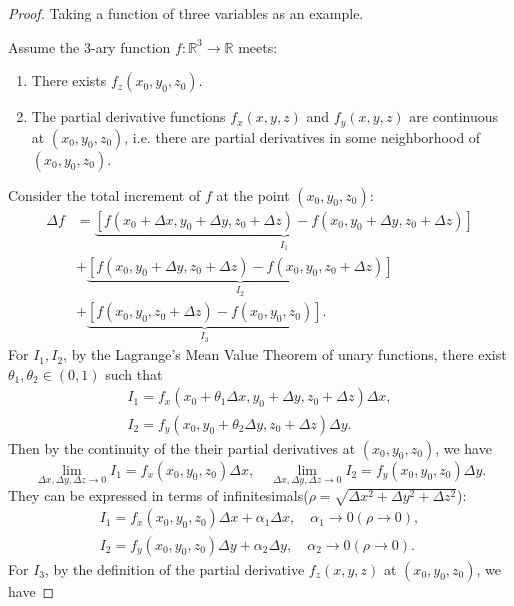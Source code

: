 \documentclass[11pt]{../../TexTemplate/elegantbook}
\begin{document}
\begin{proof}
    Taking a function of three variables as an example.

    Assume the \(3\)-ary function \(f: \mathbb{R}^3 \to \mathbb{R}\) meets:
    \begin{enumerate}
        \item There exists \(f_{z}(x_{0},y_{0},z_{0})\). 
        \item The partial derivative functions \(f_{x}(x,y,z)\) and \(f_{y}(x,y,z)\) are continuous at \((x_{0},y_{0},z_{0})\),
            i.e. there are partial derivatives in some neighborhood of \((x_{0},y_{0},z_{0})\).
    \end{enumerate}
    Consider the total increment of \(f\) at the point \((x_{0},y_{0},z_{0})\):
    \begin{align*}
        \Delta f 
        &= \underbrace{\left[ f(x_0 + \Delta x, y_0 + \Delta y, z_0 + \Delta z) - f(x_0, y_0 + \Delta y, z_0 + \Delta z) \right]}_{I_1}\\
        &+ \underbrace{\left[ f(x_0, y_0 + \Delta y, z_0 + \Delta z) - f(x_0, y_0, z_0 + \Delta z) \right]}_{I_2}\\
        &+ \underbrace{\left[ f(x_0, y_0, z_0 + \Delta z) - f(x_0, y_0, z_0) \right]}_{I_3}.
    \end{align*}
    For \(I_{1}, I_{2}\), by the Lagrange's Mean Value Theorem of unary functions, 
    there exist \(\theta_{1}, \theta_{2} \in (0,1)\) such that
    \begin{gather*}
        I_{1}=f_{x}(x_{0}+\theta_{1}\Delta x,y_{0}+\Delta y,z_{0}+\Delta z)\Delta x,\\
        I_{2}=f_{y}(x_{0},y_{0}+\theta_{2}\Delta y,z_{0}+\Delta z)\Delta y.
    \end{gather*}
    Then by the continuity of the their partial derivatives at \((x_{0},y_{0},z_{0})\), we have
    \[
        \lim_{\Delta x, \Delta y, \Delta z \to 0} I_{1} = f_{x}(x_{0},y_{0},z_{0})\Delta x, \quad
        \lim_{\Delta x, \Delta y, \Delta z \to 0} I_{2} = f_{y}(x_{0},y_{0},z_{0})\Delta y.
    \]
    They can be expressed in terms of infinitesimals(\(\rho = \sqrt{\Delta x^2 + \Delta y^2 + \Delta z^2}\)):
    \begin{align*}
        I_{1}=f_{x}(x_{0},y_{0},z_{0})\Delta x + \alpha_{1}\Delta x, \quad \alpha_{1}\to 0(\rho\to 0),\\
        I_{2}=f_{y}(x_{0},y_{0},z_{0})\Delta y + \alpha_{2}\Delta y, \quad \alpha_{2}\to 0(\rho\to 0).
    \end{align*}
    For \(I_{3}\), by the definition of the partial derivative \(f_{z}(x,y,z)\) at \((x_{0},y_{0},z_{0})\), we have

\end{proof}
\end{document}
